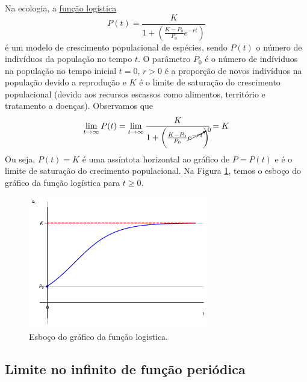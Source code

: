 \begin{ex}
  Na ecologia, a \href{https://pt.wikipedia.org/wiki/Fun%C3%A7%C3%A3o_log%C3%ADstica}{função logística}
    \begin{equation}
      P(t) = \frac{K}{1 + \left(\frac{K-P_0}{P_0}e^{-rt}\right)}
    \end{equation}
    é um modelo de crescimento populacional de espécies, sendo $P(t)$ o número de indivíduos da população no tempo $t$. O parâmetro $P_0$ é o número de indíviduos na população no tempo inicial $t=0$, $r>0$ é a proporção de novos indivíduos na população devido a reprodução e $K$ é o limite de saturação do crescimento populacional (devido aos recursos escassos como alimentos, território e tratamento a doenças). Observamos que
    \begin{equation}
      \lim_{t\to\infty} P(t) = \lim_{t\to\infty} \frac{K}{1 + \left(\frac{K-P_0}{P_0}\cancelto{0}{e^{-rt}}\right)} = K
    \end{equation}
    Ou seja, $P(t) = K$ é uma assíntota horizontal ao gráfico de $P = P(t)$ e é o limite de saturação do crecimento populacional. Na Figura \ref{fig:liminf_ex_funlogic}, temos o esboço do gráfico da função logística para $t\geq 0$.

    \begin{figure}[H]
      \centering
      \includegraphics[width=0.7\textwidth]{./cap_lim/dados/fig_liminf_ex_funlogic/fig_liminf_ex_funlogic}
      \caption{Esboço do gráfico da função logistica.}
      \label{fig:liminf_ex_funlogic}
    \end{figure}
\end{ex}

\subsection{Limite no infinito de função periódica}

